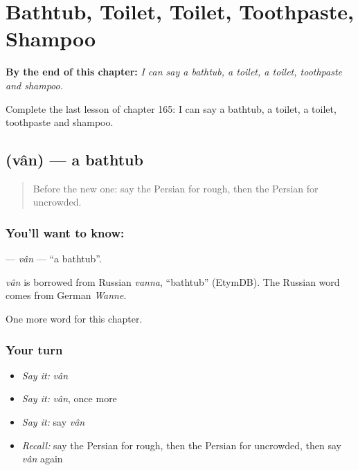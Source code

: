 
\chapter{Bathtub, Toilet, Toilet, Toothpaste, Shampoo}
\label{ch:fa-bathtub-toilet-toilet-toothpaste-shampoo}

\begin{chapteropening}
\textbf{By the end of this chapter:} \emph{I can say a bathtub, a toilet, a toilet, toothpaste and shampoo.}

Complete the last lesson of chapter 165: I can say a bathtub, a toilet, a toilet, toothpaste and shampoo.
\end{chapteropening}

\section[\texorpdfstring{\fa{وان} (vân)}{وان (vân)}]{ (vân) — a bathtub}

\label{lesson:FA-C165-van}



\begin{quote}
Before the new one: say the Persian for rough, then the Persian for uncrowded.
\end{quote}

\subsection*{You'll want to know: }
\textbf{} — \emph{vân} — \textquotedblleft{}a bathtub\textquotedblright{}.

\begin{cousinweb}
\emph{vân} is borrowed from Russian \emph{vanna}, \textquotedblleft{}bathtub\textquotedblright{} (EtymDB). The Russian word comes from German \emph{Wanne}.
\end{cousinweb}

\begin{grammarlens}[title={What you've built}]
One more word for this chapter.
\end{grammarlens}

\subsection*{Your turn}
\begin{itemize}
\raggedright
  \item \emph{Say it:} \emph{vân}
  \item \emph{Say it:} \emph{vân}, once more
  \item \emph{Say it:} say \emph{vân}
  \item \emph{Recall:} say the Persian for rough, then the Persian for uncrowded, then say \emph{vân} again
\end{itemize}

